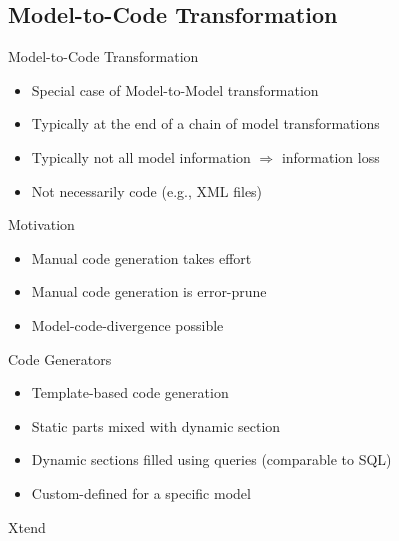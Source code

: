 \subsection{Model-to-Code Transformation}
\begin{frame}{\insertsubsection{}}
	\begin{fancycolumns}[animation=none]
		\begin{definition}{Model-to-Code Transformation}
			\begin{itemize}
				\item Special case of Model-to-Model transformation
				\item Typically at the end of a chain of model transformations
				\item Typically not all model information $\Rightarrow$ information loss
				\item Not necessarily code (e.g., XML files)
			\end{itemize}
		\end{definition}\pause
		\begin{note}{Motivation}
			\begin{itemize}
				\item Manual code generation takes effort
				\item Manual code generation is error-prune
				\item Model-code-divergence possible
			\end{itemize}
		\end{note} \pause
		\nextcolumn
		\begin{note}{Code Generators}
			\begin{itemize}
				\item Template-based code generation
				\item Static parts mixed with dynamic section
				\item Dynamic sections filled using queries (comparable to SQL)
				\item Custom-defined for a specific model
			\end{itemize}
		\end{note} \pause
		\begin{example}{Xtend}
			\centering{}
		\end{example}
		
	\end{fancycolumns}
\end{frame}


